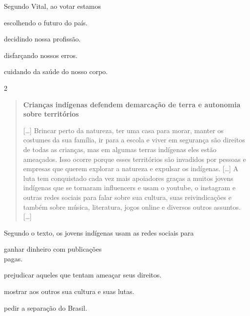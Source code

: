 Segundo Vital, ao votar estamos

\begin{minipage}{0.5\textwidth}
\begin{escolha}
\item escolhendo o futuro do país.

\item decidindo nossa profissão.

\item disfarçando nossos erros.

\item cuidando da saúde do nosso corpo.
\end{escolha}
\end{minipage}


\num{2}

\begin{quote}
\textbf{Crianças indígenas defendem demarcação de terra e autonomia
sobre territórios}

{[}\ldots{}{]}
Brincar perto da natureza, ter uma casa para morar, manter os costumes
da sua família, ir para a escola e viver em segurança são direitos de
todas as crianças, mas em algumas terras indígenas eles estão ameaçados.
Isso ocorre porque esses territórios são invadidos por pessoas e
empresas que querem explorar a natureza e expulsar os indígenas. {[}\ldots{}{]} 
A luta
tem conquistado cada vez mais apoiadores graças a muitos jovens
indígenas que se tornaram influencers e usam o youtube, o instagram e
outras redes sociais para falar sobre sua cultura, suas reivindicações e
também sobre música, literatura, jogos online e diversos outros
assuntos. {[}\ldots{}{]}

\end{quote}

Segundo o texto, os jovens indígenas usam as redes sociais para

\begin{minipage}{0.5\textwidth}
\begin{escolha}
\item ganhar dinheiro com publicações\\ pagas.

\item prejudicar aqueles que tentam ameaçar seus direitos.

\item mostrar aos outros sua cultura e suas lutas.

\item pedir a separação do Brasil.
\end{escolha}
\end{minipage}


